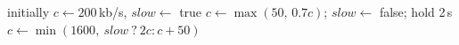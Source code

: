\begin{algorithm}[t]
\caption{Per-Robot Uplink Cap (Every 0.2\,s)}
\label{alg:cap}
\begin{algorithmic}[1]
\small
\STATE initially $c \leftarrow 200$\,kb/s, $\mathit{slow} \leftarrow$ true
  \STATE $c \leftarrow \max(50,\,0.7c)$; $\mathit{slow} \leftarrow$ false; hold 2\,s
  \STATE $c \leftarrow \min(1600,\ \mathit{slow}\ ?\ 2c : c + 50)$
\ENDIF
\end{algorithmic}
\end{algorithm}
